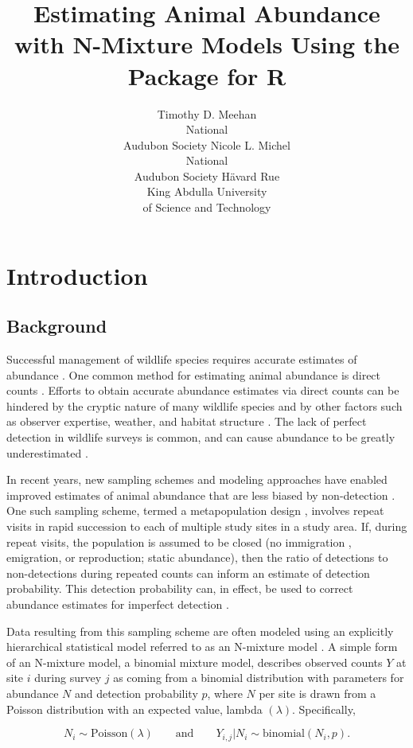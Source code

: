 \documentclass[article]{jss}
\author{Timothy D. Meehan\\National\\Audubon Society \And
        Nicole L. Michel\\National\\Audubon Society \And
        H\"{a}vard Rue\\King Abdulla University\\of Science and Technology}
\title{Estimating Animal Abundance with N-Mixture Models Using the \pkg{R-INLA} Package for R}
\begin{document}
\section[Introduction]{Introduction}
\subsection[Background]{Background}
Successful management of wildlife species requires accurate estimates of abundance \citep{Yoccoz_Nichols_Boulinier_2001}. One common method for estimating animal abundance is direct counts \citep{Pollock_Nichols_Simons_Farnsworth_Bailey_Sauer_2002}. Efforts to obtain accurate abundance estimates via direct counts can be hindered by the cryptic nature of many wildlife species and by other factors such as observer expertise, weather, and habitat structure \citep{Denes_Silveira_Beissinger_2015}. The lack of perfect detection in wildlife surveys is common, and can cause abundance to be greatly underestimated \citep{Wenger_Freeman_2008, Joseph_Elkin_Martin_Possingham_2009}.

In recent years, new sampling schemes and modeling approaches have enabled improved estimates of animal abundance that are less biased by non-detection \citep{Denes_Silveira_Beissinger_2015}. One such sampling scheme, termed a metapopulation design \citep{Kery_Royle_2010}, involves repeat visits in rapid succession to each of multiple study sites in a study area. If, during repeat visits, the population is assumed to be closed (no immigration , emigration, or reproduction; static abundance), then the ratio of detections to non-detections during repeated counts can inform an estimate of detection probability. This detection probability can, in effect, be used to correct abundance estimates for imperfect detection \citep{Royle_2004}.

Data resulting from this sampling scheme are often modeled using an explicitly hierarchical statistical model referred to as an N-mixture model \citep{Royle_Nichols_2003, Dodd_Dorazio_2004, Royle_2004, Kery_Royle_Schmid_2005}. A simple form of an N-mixture model, a binomial mixture model, describes observed counts $Y$ at site $i$ during survey $j$ as coming from a binomial distribution with parameters for abundance $N$ and detection probability $p$, where $N$ per site is drawn from a Poisson distribution with an expected value, lambda $(\lambda)$. Specifically,

$$N_i \sim \text{Poisson}(\lambda) \qquad \text{and} \qquad  Y_{i,j} | N_i \sim \text{binomial}(N_i, p).$$
\end{document}

